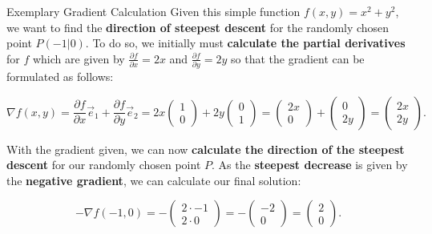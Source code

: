 \documentclass[document.tex]{subfiles}
\begin{document}
    \begin{frame}{Exemplary Gradient Calculation}
        Given this simple function $f(x, y) = x^2 + y^2$, we want to find the \textbf{direction of steepest descent} for the randomly chosen point $P(-1|0)$. To do so, we initially must \textbf{calculate the partial derivatives} for $f$ which are given by $\frac{\partial f}{\partial x} = 2x$ and $\frac{\partial f}{\partial y} = 2y$ so that the gradient can be formulated as follows:
        
        $$\nabla f(x, y) = \frac{\partial f}{\partial x} \vec{e}_1 + \frac{\partial f}{\partial y} \vec{e}_2 =  2x \begin{pmatrix} 1 \\ 0\end{pmatrix} + 2y \begin{pmatrix} 0 \\ 1\end{pmatrix} = \begin{pmatrix} 2x \\ 0\end{pmatrix} + \begin{pmatrix} 0 \\ 2y \end{pmatrix} = \begin{pmatrix}2x \\ 2y \end{pmatrix}.$$
        
        With the gradient given, we can now \textbf{calculate the direction of the steepest descent} for our randomly chosen point $P$. As the \textbf{steepest decrease} is given by the \textbf{negative gradient}, we can calculate our final solution:
        
        $$-\nabla f(-1, 0) = -\begin{pmatrix}2 \cdot -1 \\ 2 \cdot 0 \end{pmatrix} = -\begin{pmatrix} -2 \\ 0 \end{pmatrix} = \begin{pmatrix} 2 \\ 0 \end{pmatrix}.$$
        
        \vspace*{-5mm}
    \end{frame}
\end{document}
